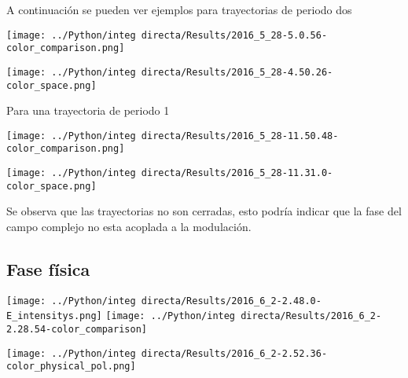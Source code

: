 	
	
	A continuación se pueden ver ejemplos para trayectorias de periodo dos
	
	\begin{minipage}{0.5\textwidth}
		
		\centering
		\texttt{[image: ../Python/integ directa/Results/2016\_5\_28-5.0.56-color\_comparison.png]}
		
	\end{minipage}
	\begin{minipage}{0.5\textwidth}
		
		\centering
		\texttt{[image: ../Python/integ directa/Results/2016\_5\_28-4.50.26-color\_space.png]}
		
	\end{minipage}
	
	Para una trayectoria de periodo 1
	
	\begin{minipage}{0.5\textwidth}
		
		\centering
		\texttt{[image: ../Python/integ directa/Results/2016\_5\_28-11.50.48-color\_comparison.png]}
		
	\end{minipage}
	\begin{minipage}{0.5\textwidth}
		
		\centering
		\texttt{[image: ../Python/integ directa/Results/2016\_5\_28-11.31.0-color\_space.png]}
		
	\end{minipage}
	
	Se observa que las trayectorias no son cerradas, esto podría indicar que la fase del campo complejo no esta acoplada  a la modulación.
	
	\subsection{Fase física}
	
	\begin{minipage}{0.5\textwidth}
		
		\centering
		\texttt{[image: ../Python/integ directa/Results/2016\_6\_2-2.48.0-E\_intensitys.png]}
		\texttt{[image: ../Python/integ directa/Results/2016\_6\_2-2.28.54-color\_comparison]}
		
	\end{minipage}
	\begin{minipage}{0.5\textwidth}
		
		\centering
		\texttt{[image: ../Python/integ directa/Results/2016\_6\_2-2.52.36-color\_physical\_pol.png]}
		
	\end{minipage}
	
